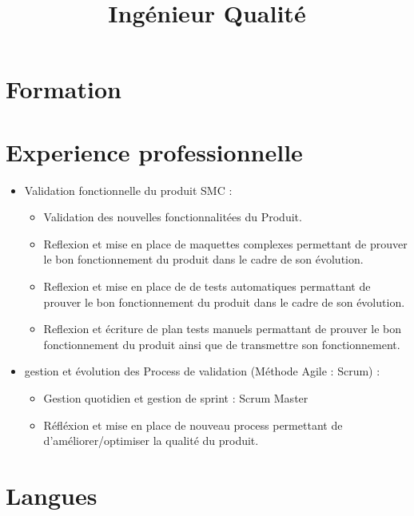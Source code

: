 \documentclass[11pt,a4paper,sans]{moderncv}
\title{Ingénieur Qualité}
\begin{document}
\makecvtitle
\section{Formation}
\section{Experience professionnelle}
%
{%
\begin{itemize}%
\item Validation fonctionnelle du produit SMC :
\begin{itemize}%
\item Validation des nouvelles fonctionnalitées du Produit.
\item Reflexion et mise en place de maquettes complexes permettant de prouver le bon fonctionnement du produit dans le cadre de son évolution.
\item Reflexion et mise en place de de tests automatiques permattant de prouver le bon fonctionnement du produit dans le cadre de son évolution.
\item Reflexion et écriture de plan tests manuels permattant de prouver le bon fonctionnement du produit ainsi que de transmettre son fonctionnement.
\end{itemize}
\end{itemize}
\begin{itemize}%
\item gestion et évolution des Process de validation (Méthode Agile : Scrum) :
\begin{itemize}%
\item Gestion quotidien et gestion de sprint : Scrum Master
\item Réfléxion et mise en place de nouveau process permettant de d'améliorer/optimiser la qualité du produit.
\end{itemize}
\end{itemize}
}
\section{Langues}
\end{document}
